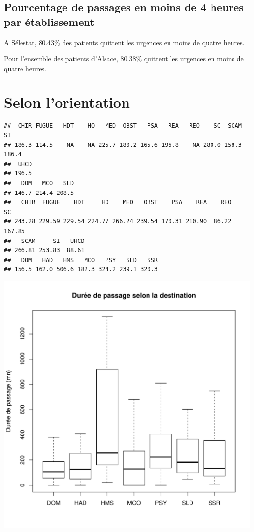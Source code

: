 \documentclass[12pt,english,french,twoside]{report}\usepackage[]{graphicx}\usepackage[]{color}
\makeatletter
\def\maxwidth{ %
  \ifdim\Gin@nat@width>\linewidth
    \linewidth
  \else
    \Gin@nat@width
  \fi
}
\newenvironment{kframe}{%
 \def\at@end@of@kframe{}%
 \ifinner\ifhmode%
  \def\at@end@of@kframe{\end{minipage}}%
  \begin{minipage}{\columnwidth}%
 \fi\fi%
 \def\FrameCommand##1{\hskip\@totalleftmargin \hskip-\fboxsep
 \colorbox{shadecolor}{##1}\hskip-\fboxsep
     \hskip-\linewidth \hskip-\@totalleftmargin \hskip\columnwidth}%
 \MakeFramed {\advance\hsize-\width
   \@totalleftmargin\z@ \linewidth\hsize
   \@setminipage}}%
 {\par\unskip\endMakeFramed%
 \at@end@of@kframe}
\newenvironment{knitrout}{}{} %
\makeatother
\begin{document}
\subsection*{Pourcentage de passages en moins de 4 heures par établissement}




A Sélestat, 80.43\% des patients quittent les urgences en moins de quatre heures.

Pour l'ensemble des patients d'Alsace, 80.38\% quittent les urgences en moins de quatre heures.


\section*{Selon l'orientation}
\begin{knitrout}
\color{fgcolor}\begin{kframe}
\begin{verbatim}
##  CHIR FUGUE   HDT    HO   MED  OBST   PSA   REA   REO    SC  SCAM    SI 
## 186.3 114.5    NA    NA 225.7 180.2 165.6 196.8    NA 280.0 158.3 186.4 
##  UHCD 
## 196.5
##   DOM   MCO   SLD 
## 146.7 214.4 208.5
##   CHIR  FUGUE    HDT     HO    MED   OBST    PSA    REA    REO     SC 
## 243.28 229.59 229.54 224.77 266.24 239.54 170.31 210.90  86.22 167.85 
##   SCAM     SI   UHCD 
## 266.81 253.83  88.61
##   DOM   HAD   HMS   MCO   PSY   SLD   SSR 
## 156.5 162.0 506.6 182.3 324.2 239.1 320.3
\end{verbatim}
\end{kframe}
\includegraphics[width=\maxwidth]{figure/duree_orientation} 

\end{knitrout}
\end{document}
